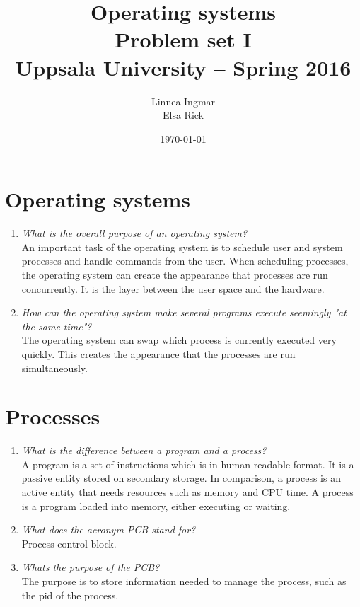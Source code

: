 \documentclass[a4paper]{article}
\title{\textbf{Operating systems \\
    Problem set I \\
    Uppsala University -- Spring 2016 \\}}
\author{Linnea Ingmar \\
  Elsa Rick}
\date{\today}
\begin{document}
\maketitle

\section{Operating systems}
\begin{enumerate}
  \item \textit{What is the overall purpose of an operating system?} \\
    An important task of the operating system is to schedule user and system processes and handle commands from the user. When scheduling processes, the operating system can create the appearance that processes are run concurrently. It is the layer between the user space and the hardware.
  \item \textit{How can the operating system make several programs execute seemingly "at the same time"?} \\
    The operating system can swap which process is currently executed very quickly. This creates the appearance that the processes are run simultaneously.
\end{enumerate}

\section{Processes}
\begin{enumerate}
  \item \textit{What is the difference between a program and a process?} \\
    A program is a set of instructions which is in human readable format. It is a passive entity stored on secondary storage. In comparison, a process is an active entity that needs resources such as memory and CPU time. A process is a program loaded into memory, either executing or waiting.
  \item \textit{What does the acronym PCB stand for?} \\
    Process control block.
  \item \textit{Whats the purpose of the PCB?} \\
    The purpose is to store information needed to manage the process, such as the pid of the process. 
\end{enumerate}
\end{document}
